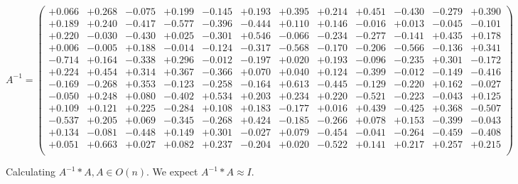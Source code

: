 \documentclass[9pt]{article}
\theoremstyle{plain}
\theoremstyle{definition}
\theoremstyle{remark}
\numberwithin{equation}{section}
\begin{document}
$A^{-1} = \left(
\begin{array}{
cccccccccccc}
+0.066 & +0.268 & -0.075 & +0.199 & -0.145 & +0.193 & +0.395 & +0.214 & +0.451 & -0.430 & -0.279 & +0.390 \\
+0.189 & +0.240 & -0.417 & -0.577 & -0.396 & -0.444 & +0.110 & +0.146 & -0.016 & +0.013 & -0.045 & -0.101 \\
+0.220 & -0.030 & -0.430 & +0.025 & -0.301 & +0.546 & -0.066 & -0.234 & -0.277 & -0.141 & +0.435 & +0.178 \\
+0.006 & -0.005 & +0.188 & -0.014 & -0.124 & -0.317 & -0.568 & -0.170 & -0.206 & -0.566 & -0.136 & +0.341 \\
-0.714 & +0.164 & -0.338 & +0.296 & -0.012 & -0.197 & +0.020 & +0.193 & -0.096 & -0.235 & +0.301 & -0.172 \\
+0.224 & +0.454 & +0.314 & +0.367 & -0.366 & +0.070 & +0.040 & +0.124 & -0.399 & -0.012 & -0.149 & -0.416 \\
-0.169 & -0.268 & +0.353 & -0.123 & -0.258 & -0.164 & +0.613 & -0.445 & -0.129 & -0.220 & +0.162 & -0.027 \\
-0.050 & +0.248 & +0.080 & -0.402 & +0.534 & +0.203 & +0.234 & +0.220 & -0.521 & -0.223 & -0.043 & +0.125 \\
+0.109 & +0.121 & +0.225 & -0.284 & +0.108 & +0.183 & -0.177 & +0.016 & +0.439 & -0.425 & +0.368 & -0.507 \\
-0.537 & +0.205 & +0.069 & -0.345 & -0.268 & +0.424 & -0.185 & -0.266 & +0.078 & +0.153 & -0.399 & -0.043 \\
+0.134 & -0.081 & -0.448 & +0.149 & +0.301 & -0.027 & +0.079 & -0.454 & -0.041 & -0.264 & -0.459 & -0.408 \\
+0.051 & +0.663 & +0.027 & +0.082 & +0.237 & -0.204 & +0.020 & -0.522 & +0.141 & +0.217 & +0.257 & +0.215 \\
\end{array}
\right)$ \newline 

Calculating $A^{-1} *A  ,  A \in O(n)$.   We expect $A^{-1} *A  \approx I$. 
\end{document}

